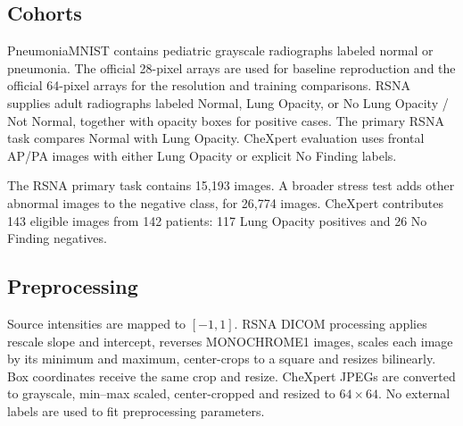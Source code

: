 \documentclass{article}
\begin{document}
\subsection{Cohorts}
PneumoniaMNIST contains pediatric grayscale radiographs labeled normal or pneumonia. The official 28-pixel arrays are used for baseline reproduction and the official 64-pixel arrays for the resolution and training comparisons. RSNA supplies adult radiographs labeled Normal, Lung Opacity, or No Lung Opacity / Not Normal, together with opacity boxes for positive cases. The primary RSNA task compares Normal with Lung Opacity. CheXpert evaluation uses frontal AP/PA images with either Lung Opacity or explicit No Finding labels.

\begin{table}[htbp]
\caption{Data used in the study. Image counts are complete; PneumoniaMNIST does not provide patient identifiers.}
\label{tab:data}\centering\small
{}
\end{table}

The RSNA primary task contains 15,193 images. A broader stress test adds other abnormal images to the negative class, for 26,774 images. CheXpert contributes 143 eligible images from 142 patients: 117 Lung Opacity positives and 26 No Finding negatives.

\subsection{Preprocessing}
Source intensities are mapped to $[-1,1]$. RSNA DICOM processing applies rescale slope and intercept, reverses MONOCHROME1 images, scales each image by its minimum and maximum, center-crops to a square and resizes bilinearly. Box coordinates receive the same crop and resize. CheXpert JPEGs are converted to grayscale, min--max scaled, center-cropped and resized to $64\times64$. No external labels are used to fit preprocessing parameters.
\end{document}
